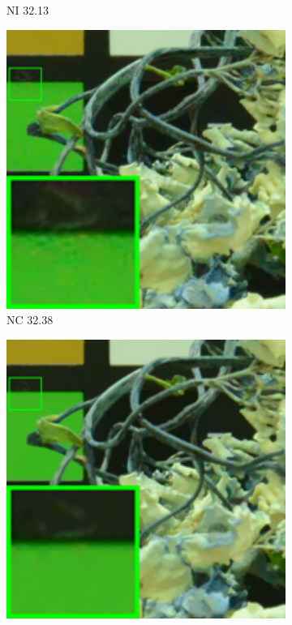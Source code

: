 \begin{figure}
\begin{subfigure}[t]{0.19\textwidth}
\caption{NI 32.13}
    \end{subfigure}
\hfill
    \begin{subfigure}[t]{0.19\textwidth}
        \centering
        \includegraphics[width=1\textwidth]{images/mcwnnm/cc/resize_br_NC_CC15_d800_iso6400_2.png}
		\caption{NC 32.38}
    \end{subfigure}
    \hfill
    \begin{subfigure}[t]{0.19\textwidth}
        \centering
        \includegraphics[width=1\textwidth]{images/mcwnnm/cc/resize_br_CC_d800_iso6400_2.png}

\end{subfigure}
\end{figure}
